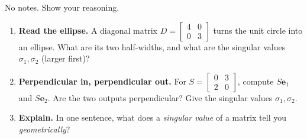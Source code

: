 \documentclass[10pt]{article}
\newcommand{\ee}{\mathbf{e}}
\begin{document}
\namedateperiod

\vspace{0.15in}

No notes. Show your reasoning.

\begin{enumerate}[leftmargin=1.8em, itemsep=16pt]
  \item \textbf{Read the ellipse.} A diagonal matrix $D=\begin{bmatrix} 4 & 0 \\ 0 & 3 \end{bmatrix}$
        turns the unit circle into an ellipse. What are its two half-widths, and what are the singular
        values $\sigma_1,\sigma_2$ (larger first)?
        \vspace{1.2cm}
  \item \textbf{Perpendicular in, perpendicular out.} For $S=\begin{bmatrix} 0 & 3 \\ 2 & 0 \end{bmatrix}$,
        compute $S\ee_1$ and $S\ee_2$. Are the two outputs perpendicular? Give the singular values
        $\sigma_1,\sigma_2$.
        \vspace{1.3cm}
  \item \textbf{Explain.} In one sentence, what does a \emph{singular value} of a matrix tell you
        \emph{geometrically}?
\end{enumerate}
\end{document}
